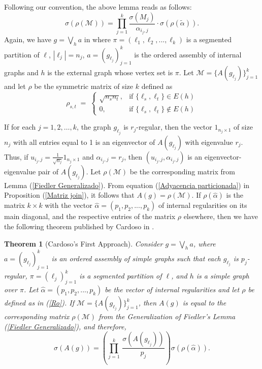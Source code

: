 \documentclass[11pt]{article}
\newtheorem{theorem}{Theorem}[section]
\theoremstyle{definition}
\begin{document}
Following our convention, the above lemma reads as follows:
\begin{equation}
\sigma(\rho(\mathcal{M})) = \prod_{j=1}^k \frac{\sigma(M_j)}{\alpha_{i_j,j}} \cdot \sigma(\rho(\widetilde{\alpha})).
\end{equation}
Again, we have $g=\displaystyle{\bigvee_h a}$ in where $\pi=(\ell_1, \ell_2,..., \ell_k)$ is a segmented partition of $\ell$, $|\ell_j|=n_j$, $\mathit{a}=(g_{\ell_j})^k_{j=1}$ is the ordered assembly of internal graphs and $h$ is the external graph whose vertex set is $\pi$. Let $\mathcal{M}=\{A(g_{\ell_j})\}^k_{j=1}$ and let $\rho$ be the symmetric matrix of size $k$ defined as
\begin{equation}\label{Ro}
	\rho_{s,t}\;=\;\left\{\begin{array}{ll}
													\sqrt{n_sn_t}, & \mbox{if } \{\ell_s, \ell_t\}\in E(h)\\[0.3cm]
													            0, & \mbox{if } \{\ell_s, \ell_t\}\notin E(h)
												   \end{array}\right.
\end{equation}

If for each $j = 1, 2, \ldots, k$, the graph $g_{\ell_j}$ is $r_j$-regular, then the vector $1_{n_j\times 1}$ of size $n_j$ with all entries equal to 1 is an eigenvector of $A(g_{\ell_j})$ with eigenvalue $r_j$. Thus, if $u_{i_j, j}=\frac{1}{\sqrt{n_j}}1_{n_j\times 1}$ and $\alpha_{i_j, j}=r_j$, then $(u_{i_j, j}, \alpha_{i_j, j})$ is an eigenvector-eigenvalue pair of $A(g_{\ell_j})$. Let $\rho(\mathcal{M})$ be the corresponding matrix from Lemma (\ref{Fiedler Generalizado}). From equation (\ref{Adyacencia particionada}) in Proposition (\ref{Matriz join}), it follows that $A(g) = \rho(\mathcal{M})$. If $\rho(\hat{\alpha})$ is the matrix $k\times k$ with the vector $\hat{\alpha} = (p_1, p_2, ..., p_k)$ of internal regularities on its main diagonal, and the respective entries of the matrix $\rho$ elsewhere, then we have the following theorem published by Cardoso in \cite{Cardoso2013}.

\begin{theorem}[Cardoso's First Approach]\label{2.11}
Consider $g = \displaystyle{\bigvee_h \mathit{a}}$, where $\mathit{a} =(g_{\ell_j})^k_{j=1}$ is an ordered assembly of simple graphs such that each $g_{\ell_j}$ is $p_j$-regular, $\pi=(\ell_j)^k_{j=1}$ is a segmented partition of $\ell$, and $h$ is a simple graph over $\pi$. Let $\hat{\alpha} = (p_1, p_2, ..., p_k)$ be the vector of internal regularities and let $\rho$ be defined as in (\ref{Ro}). If $\mathcal{M} = \{A(g_{\ell_j})\}^k_{j=1}$, then $A(g)$ is equal to the corresponding matrix $\rho(\mathcal{M})$ from the Generalization of Fiedler's Lemma (\ref{Fiedler Generalizado}), and therefore,
	\begin{equation}\label{espectro adyacencia}
	\sigma(A(g))=\left(\prod_{j=1}^{k}\,\dfrac{\sigma(A(g_{\ell_j}))}{p_j}\right) \sigma(\rho(\hat{\alpha})).
\end{equation}
\end{theorem}
\end{document}
